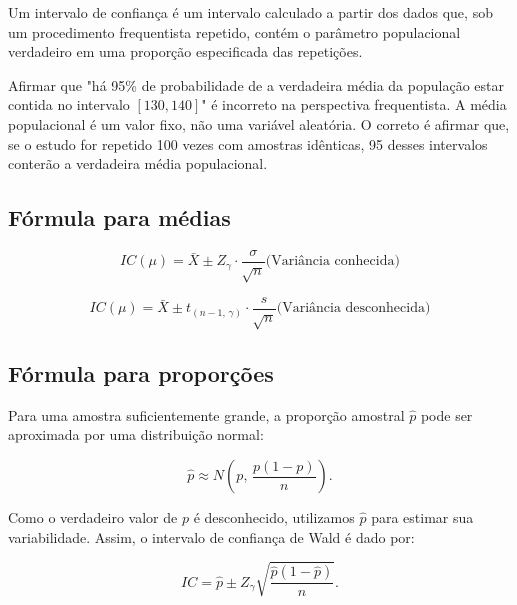 \begin{definition}
Um intervalo de confiança é um intervalo calculado a partir dos dados que, sob um procedimento frequentista repetido, contém o parâmetro populacional verdadeiro em uma proporção especificada das repetições.
\end{definition}

\begin{error}
Afirmar que "há 95\% de probabilidade de a verdadeira média da população estar contida no intervalo $[130, 140]$" é incorreto na perspectiva frequentista. A média populacional é um valor fixo, não uma variável aleatória. O correto é afirmar que, se o estudo for repetido 100 vezes com amostras idênticas, 95 desses intervalos conterão a verdadeira média populacional.
\end{error}

\subsection{Fórmula para médias}

\begin{equation}
  IC(\mu) = \bar{X} \pm Z_{\gamma} \cdot \frac{\sigma}{\sqrt{n}} \text{(Variância conhecida)}
\end{equation}

\begin{equation}
  IC(\mu) = \bar{X} \pm t_{(n-1,\, \gamma)} \cdot \frac{s}{\sqrt{n}} \text{(Variância desconhecida)}
\end{equation}

\subsection{Fórmula para proporções}

Para uma amostra suficientemente grande, a proporção amostral $\hat{p}$ pode
ser aproximada por uma distribuição normal:

\begin{equation}
    \hat{p}
    \approx
    N\left(
        p,\,
        \frac{p(1-p)}{n}
    \right).
\end{equation}

Como o verdadeiro valor de $p$ é desconhecido, utilizamos $\hat{p}$ para
estimar sua variabilidade. Assim, o intervalo de confiança de Wald é dado por:

\begin{equation}
    IC
    =
    \hat{p}
    \pm
    Z_{\gamma}
    \sqrt{
        \frac{\hat{p}(1-\hat{p})}{n}
    }.
\end{equation}

